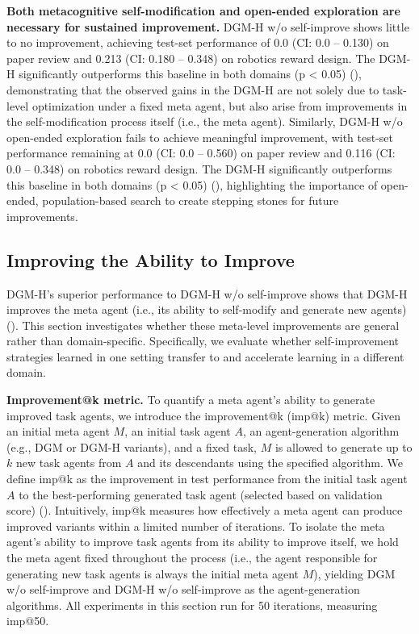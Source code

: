 \documentclass{article}
\begin{document}
\textbf{Both metacognitive self-modification and open-ended exploration are necessary for sustained improvement.}
DGM-H w/o self-improve \citep{huautomated} shows little to no improvement, achieving test-set performance of 0.0 (CI: 0.0 -- 0.130) on paper review and 0.213 (CI: 0.180 -- 0.348) on robotics reward design. The DGM-H significantly outperforms this baseline in both domains (p < 0.05) (), demonstrating that the observed gains in the DGM-H are not solely due to task-level optimization under a fixed meta agent, but also arise from improvements in the self-modification process itself (i.e., the meta agent).
Similarly, DGM-H w/o open-ended exploration fails to achieve meaningful improvement, with test-set performance remaining at 0.0 (CI: 0.0 -- 0.560) on paper review and 0.116 (CI: 0.0 -- 0.348) on robotics reward design. The DGM-H significantly outperforms this baseline in both domains (p < 0.05) (), highlighting the importance of open-ended, population-based search to create stepping stones for future improvements.

\vspace{-0.5em}
\subsection{Improving the Ability to Improve}
\label{sec:results-meta}
\vspace{-0.5em}

DGM-H's superior performance to DGM-H w/o self-improve shows that DGM-H improves the meta agent (i.e., its ability to self-modify and generate new agents) (). This section investigates whether these meta-level improvements are general rather than domain-specific. Specifically, we evaluate whether self-improvement strategies learned in one setting transfer to and accelerate learning in a different domain.

\textbf{Improvement@k metric.} To quantify a meta agent's ability to generate improved task agents, we introduce the improvement@k (imp@k) metric. Given an initial meta agent $M$, an initial task agent $A$, an agent-generation algorithm (e.g., DGM or DGM-H variants), and a fixed task, $M$ is allowed to generate up to $k$ new task agents from $A$ and its descendants using the specified algorithm. We define imp@k as the improvement in test performance from the initial task agent $A$ to the best-performing generated task agent (selected based on validation score) (). Intuitively, imp@k measures how effectively a meta agent can produce improved variants within a limited number of iterations. To isolate the meta agent's ability to improve task agents from its ability to improve itself, we hold the meta agent fixed throughout the process (i.e., the agent responsible for generating new task agents is always the initial meta agent $M$), yielding DGM w/o self-improve and DGM-H w/o self-improve as the agent-generation algorithms. All experiments in this section run for 50 iterations, measuring imp@50.
\end{document}
